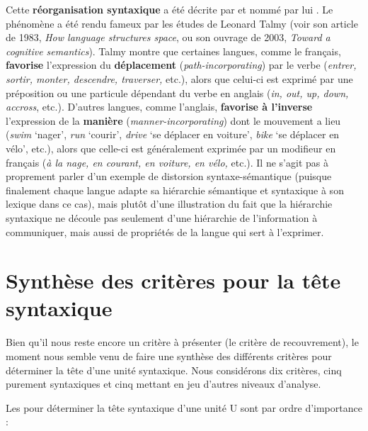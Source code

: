 {    Cette \textbf{réorganisation syntaxique} a été décrite par \citet[chapitre 131]{tesniere1959elements} et nommé par lui . Le phénomène a été rendu fameux par les études de Leonard Talmy (voir son article de 1983, \textit{How language structures space}, ou son ouvrage de 2003, \textit{Toward a cognitive semantics}). Talmy montre que certaines langues, comme le français, \textbf{favorise} l'expression du \textbf{déplacement} (\textit{path-incorporating}) par le verbe (\textit{entrer, sortir, monter, descendre, traverser,} etc.), alors que celui-ci est exprimé par une préposition ou une particule dépendant du verbe en anglais (\textit{in, out, up, down, accross}, etc.). D’autres langues, comme l’anglais, \textbf{favorise à l’inverse} l'expression de la \textbf{manière} (\textit{manner-incorporating}) dont le mouvement a lieu (\textit{swim} ‘nager’, \textit{run} ‘courir’, \textit{drive} ‘se déplacer en voiture’, \textit{bike} ‘se déplacer en vélo’, etc.), alors que celle-ci est généralement exprimée par un modifieur en français (\textit{à la nage, en courant, en voiture, en vélo,} etc.). Il ne s’agit pas à proprement parler d’un exemple de distorsion syntaxe-sémantique (puisque finalement chaque langue adapte sa hiérarchie sémantique et syntaxique à son lexique dans ce cas), mais plutôt d’une illustration du fait que la hiérarchie syntaxique ne découle pas seulement d’une hiérarchie de l’information à communiquer, mais aussi de propriétés de la langue qui sert à l’exprimer.
}


\section{Synthèse des critères pour la tête syntaxique}\label{sec:3.3.20}

Bien qu’il nous reste encore un critère à présenter (le critère de recouvrement), le moment nous semble venu de faire une synthèse des différents critères pour déterminer la tête d’une unité syntaxique. Nous considérons dix critères, cinq purement syntaxiques et cinq mettant en jeu d’autres niveaux d’analyse.

Les  pour déterminer la tête syntaxique d’une unité U sont par ordre d’importance :


